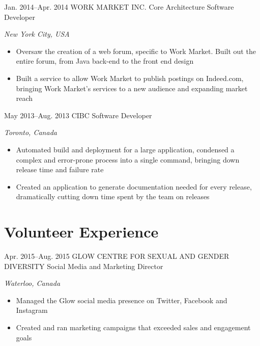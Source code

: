 \documentclass{friggeri-cv}
\begin{document}
\begin{sectionlist}
	\entry
	{Jan. 2014--Apr. 2014}
	{WORK MARKET INC.}
	{Core Architecture Software Developer }
	{\emph {New York City, USA}\\
		\begin{itemize}
		    \setlength{\itemsep}{0.2em}
			\item Oversaw the creation of a web forum, specific to Work Market. Built out the entire forum,  from Java back-end to the front end design
			\item Built a service to allow Work Market to publish postings on Indeed.com, bringing Work Market's services to a new audience and expanding market reach
		\end{itemize}
	}
	
	\entry
	{May 2013--Aug. 2013}
	{CIBC}
	{Software Developer}
	{\emph {Toronto, Canada} \\
		\begin{itemize}
		    \setlength{\itemsep}{0.2em}
			\item Automated build and deployment for a large application, condensed a complex and error-prone process into a single command, bringing down release time and failure rate
			\item Created an application to generate documentation needed for every release,\\dramatically cutting down time spent by the team on releases
		\end{itemize}
	}
	
\end{sectionlist}



\vspace{-2.5\parskip}
\section{Volunteer Experience}


\begin{sectionlist}
	
	\entry
	{Apr. 2015--Aug. 2015}
	{GLOW CENTRE FOR SEXUAL AND GENDER DIVERSITY}
	{Social Media and Marketing Director}
	{\emph{Waterloo, Canada} \\
		\begin{itemize}
		    \setlength{\itemsep}{0.2em}
			\item Managed the Glow social media presence on Twitter, Facebook and Instagram
			\item Created and ran marketing campaigns that exceeded sales and engagement goals  
		\end{itemize}
	}

\end{sectionlist}
\end{document}
